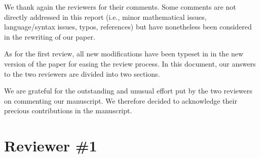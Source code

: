 \documentclass[10pt]{article}
\begin{document}
	\maketitle	

We thank again the reviewers for their comments. Some comments are not directly addressed in this report (i.e., minor mathematical issues, language/syntax issues, typos, references) but have nonetheless been considered in the rewriting of our paper.

As for the first review, all new modifications have been typeset in  in the new version of the paper for easing the review process. In this document, our answers to the two reviewers are divided into two sections.

We are grateful for the outstanding and unusual effort put by the two reviewers on commenting our manuscript. We therefore decided to acknowledge their precious contributions in the manuscript.

\section{Reviewer \#1}
\end{document}
